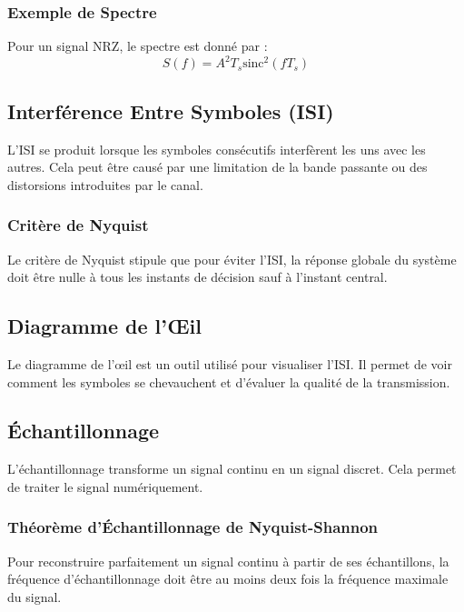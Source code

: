 \documentclass[10pt,a4paper]{article}
\begin{document}
\subsubsection*{Exemple de Spectre}
Pour un signal NRZ, le spectre est donné par :
\[ S(f) = A^2 T_s \text{sinc}^2(f T_s) \]

\subsection*{Interférence Entre Symboles (ISI)}
L'ISI se produit lorsque les symboles consécutifs interfèrent les uns avec les autres. Cela peut être causé par une limitation de la bande passante ou des distorsions introduites par le canal.

\subsubsection*{Critère de Nyquist}
Le critère de Nyquist stipule que pour éviter l'ISI, la réponse globale du système doit être nulle à tous les instants de décision sauf à l'instant central.

\subsection*{Diagramme de l'Œil}
Le diagramme de l'œil est un outil utilisé pour visualiser l'ISI. Il permet de voir comment les symboles se chevauchent et d'évaluer la qualité de la transmission.


\subsection*{Échantillonnage}
L'échantillonnage transforme un signal continu en un signal discret. Cela permet de traiter le signal numériquement.

\subsubsection*{Théorème d'Échantillonnage de Nyquist-Shannon}
Pour reconstruire parfaitement un signal continu à partir de ses échantillons, la fréquence d'échantillonnage doit être au moins deux fois la fréquence maximale du signal.
\end{document}
